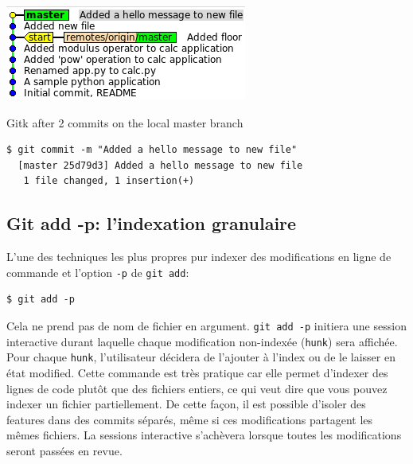 \documentclass{../../common/tufte-latex/tufte-handout}
\begin{document}
\begin{marginfigure}%
  \centering
  \includegraphics[width=\linewidth]{gitk-2commits.png}
  \label{fig:gitk2commits}
  \caption{Gitk after 2 commits on the local master branch}
\end{marginfigure}

\begin{lstlisting}[style=BashInputStyle]
  $ git commit -m "Added a hello message to new file"
  [master 25d79d3] Added a hello message to new file
   1 file changed, 1 insertion(+)
\end{lstlisting}

\subsection{Git add -p: l'indexation granulaire}

L'une des techniques les plus propres pur indexer des modifications en ligne de commande et l'option \texttt{-p} de \texttt{git add}:

\begin{lstlisting}[style=BashInputStyle]
  $ git add -p
\end{lstlisting}

Cela ne prend pas de nom de fichier en argument.
\texttt{git add -p} initiera une session interactive durant laquelle chaque modification non-indexée (\texttt{hunk}) sera affichée. Pour chaque \texttt{hunk}, l'utilisateur décidera de l'ajouter à l'index ou de le laisser en état modified. 
Cette commande est très pratique car elle permet d'indexer des lignes de code plutôt que des fichiers entiers, ce qui veut dire que vous pouvez indexer un fichier partiellement.
De cette façon, il est possible d'isoler des features dans des commits séparés, même si ces modifications partagent les mêmes fichiers.
La sessions interactive s'achèvera lorsque toutes les modifications seront passées en revue.
\end{document}
